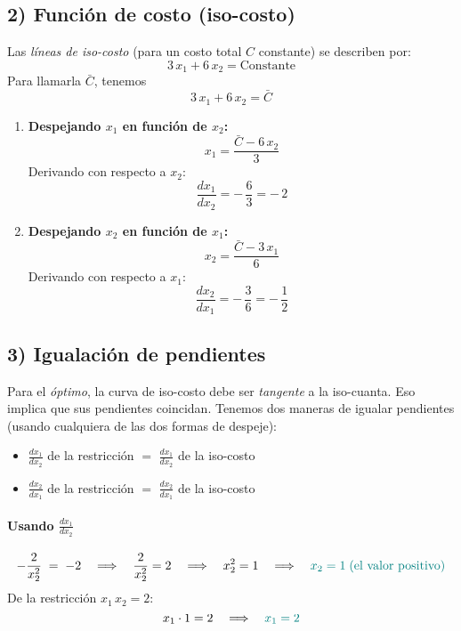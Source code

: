 \documentclass{article}
\begin{document}
\bigskip

\subsection*{2) Función de costo (iso-costo)}

Las \emph{líneas de iso-costo} (para un costo total \(C\) constante) se describen por:
\[
3\,x_1 + 6\,x_2 = \text{Constante}
\]
Para llamarla \(\bar{C}\), tenemos
\[
3\,x_1 + 6\,x_2 = \bar{C}
\]

\begin{enumerate}
    \item \textbf{Despejando \(x_1\) en función de \(x_2\):}
    \[
    x_1 = \frac{\bar{C} - 6\,x_2}{3}
    \]
    Derivando con respecto a \(x_2\):
    \[
    \frac{dx_1}{dx_2}
    = -\,\frac{6}{3}
    = -\,2
    \]

    \item \textbf{Despejando \(x_2\) en función de \(x_1\):}
    \[
    x_2 = \frac{\bar{C} - 3\,x_1}{6}
    \]
    Derivando con respecto a \(x_1\):
    \[
    \frac{dx_2}{dx_1}
    = -\,\frac{3}{6}
    = -\,\frac{1}{2}
    \]
\end{enumerate}

\bigskip

\subsection*{3) Igualación de pendientes}

Para el \emph{óptimo}, la curva de iso-costo debe ser \emph{tangente} a la iso-cuanta. Eso implica que sus pendientes coincidan. Tenemos dos maneras de igualar pendientes (usando cualquiera de las dos formas de despeje):

\begin{itemize}
    \item \(\displaystyle \frac{dx_1}{dx_2}\) de la restricción \(=\) \(\displaystyle \frac{dx_1}{dx_2}\) de la iso-costo
    \item \(\displaystyle \frac{dx_2}{dx_1}\) de la restricción \(=\) \(\displaystyle \frac{dx_2}{dx_1}\) de la iso-costo
\end{itemize}

\paragraph{Usando \(\tfrac{dx_1}{dx_2}\)}

\[
-\frac{2}{x_2^2} \;=\; -2
\quad \Longrightarrow \quad
\frac{2}{x_2^2} = 2
\quad \Longrightarrow \quad
x_2^2 = 1
\quad \Longrightarrow \quad
\color{teal}{x_2 = 1} \; (\text{el valor positivo})
\]
De la restricción \(x_1\,x_2 = 2\):
\[
x_1 \cdot 1 = 2
\quad \Longrightarrow \quad
\color{teal}{x_1 = 2}
\]
\end{document}
